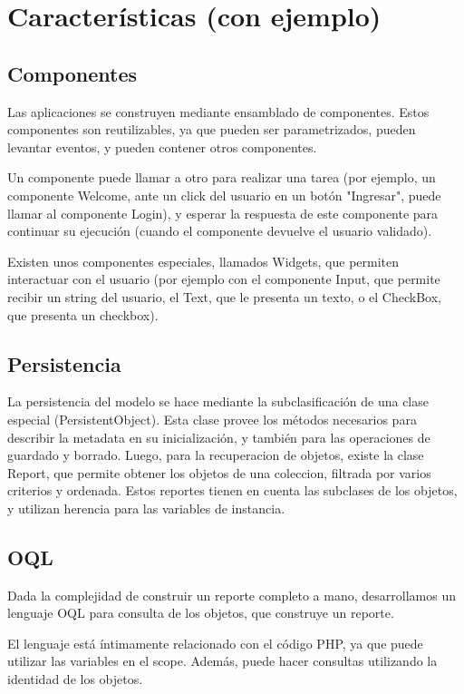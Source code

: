 \section{Características (con ejemplo)}

\subsection{Componentes}

Las aplicaciones se construyen mediante ensamblado de componentes. Estos componentes son reutilizables,
ya que pueden ser parametrizados, pueden levantar eventos, y pueden contener otros componentes.

Un componente puede llamar a otro para realizar una tarea (por ejemplo, un componente Welcome, ante un click
del usuario en un botón "Ingresar", puede llamar al componente Login), y esperar la respuesta de este
componente para continuar su ejecución (cuando el componente devuelve el usuario validado).

Existen unos componentes especiales, llamados Widgets, que permiten interactuar con el usuario (por ejemplo
con el componente Input, que permite recibir un string del usuario, el Text, que le presenta un texto, o el
CheckBox, que presenta un checkbox).

\subsection{Persistencia}

La persistencia del modelo se hace mediante la subclasificación de una clase especial (PersistentObject).
Esta clase provee los métodos necesarios para describir la metadata en su inicialización, y también para las
operaciones de guardado y borrado.
Luego, para la recuperacion de objetos, existe la clase Report, que permite obtener los objetos de una
coleccion, filtrada por varios criterios y ordenada. Estos reportes tienen en cuenta las subclases de los
objetos, y utilizan herencia para las variables de instancia.

\subsection{OQL}

Dada la complejidad de construir un reporte completo a mano, desarrollamos un lenguaje OQL para consulta de
los objetos, que construye un reporte.

El lenguaje está íntimamente relacionado con el código PHP, ya que puede utilizar las variables en el scope.
Además, puede hacer consultas utilizando la identidad de los objetos.

